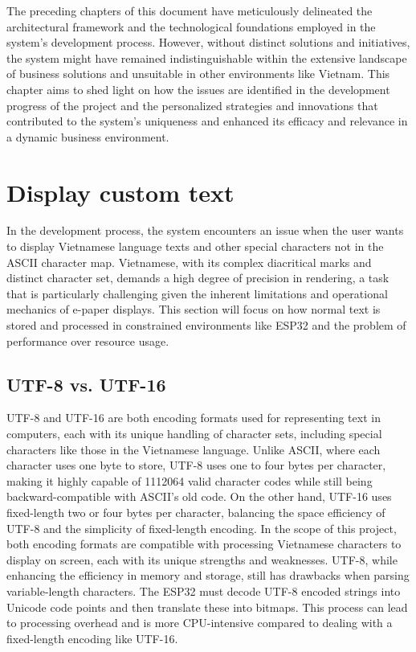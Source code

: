 \documentclass[../Main.tex]{subfiles}
\begin{document}
The preceding chapters of this document have meticulously delineated the architectural framework and the technological foundations employed in the system's development process. However, without distinct solutions and initiatives, the system might have remained indistinguishable within the extensive landscape of business solutions and unsuitable in other environments like Vietnam. This chapter aims to shed light on how the issues are identified in the development progress of the project and the personalized strategies and innovations that contributed to the system's uniqueness and enhanced its efficacy and relevance in a dynamic business environment.

\section{Display custom text}
\label{section:custom-font}
In the development process, the system encounters an issue when the user wants to display Vietnamese language texts and other special characters not in the ASCII character map. Vietnamese, with its complex diacritical marks and distinct character set, demands a high degree of precision in rendering, a task that is particularly challenging given the inherent limitations and operational mechanics of e-paper displays. This section will focus on how normal text is stored and processed in constrained environments like ESP32 and the problem of performance over resource usage. 

\subsection{UTF-8 vs. UTF-16}
\label{encoding}
UTF-8 and UTF-16 are both encoding formats used for representing text in computers, each with its unique handling of character sets, including special characters like those in the Vietnamese language. Unlike ASCII, where each character uses one byte to store, UTF-8 uses one to four bytes per character, making it highly capable of 1112064 valid character codes while still being backward-compatible with ASCII's old code. On the other hand, UTF-16 uses fixed-length two or four bytes per character, balancing the space efficiency of UTF-8 and the simplicity of fixed-length encoding. In the scope of this project, both encoding formats are compatible with processing Vietnamese characters to display on screen, each with its unique strengths and weaknesses. UTF-8, while enhancing the efficiency in memory and storage, still has drawbacks when parsing variable-length characters. The ESP32 must decode UTF-8 encoded strings into Unicode code points and then translate these into bitmaps. This process can lead to processing overhead and is more CPU-intensive compared to dealing with a fixed-length encoding like UTF-16.
\end{document}
